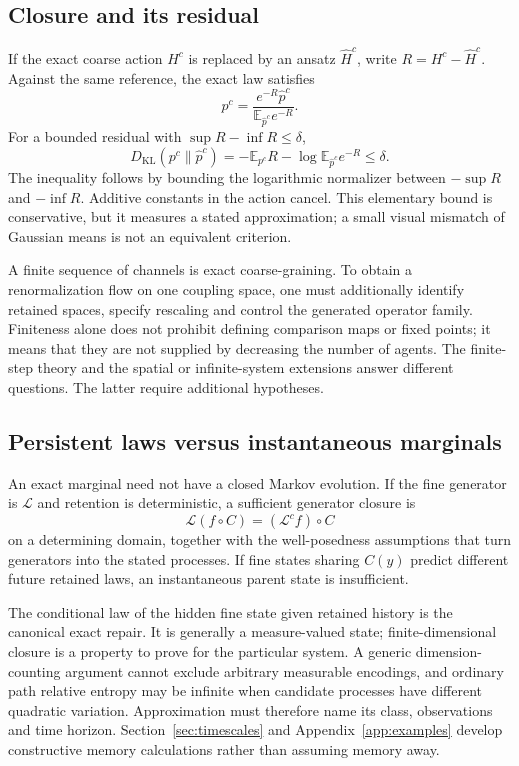 \subsection{Closure and its residual}
If the exact coarse action $H^c$ is replaced by an ansatz $\widehat H^c$, write $R=H^c-\widehat H^c$. Against the same reference, the exact law satisfies
\begin{equation}
p^c=\frac{e^{-R}\widehat p^c}{\mathbb E_{\widehat p^c}e^{-R}}.
\label{eq:coarse_residual_law}
\end{equation}
For a bounded residual with $\sup R-\inf R\leq\delta$,
\begin{equation}
D_{\mathrm{KL}}(p^c\|\widehat p^c)
=-\mathbb E_{p^c}R-\log\mathbb E_{\widehat p^c}e^{-R}
\leq\delta.
\label{eq:closure_residual_bound}
\end{equation}
The inequality follows by bounding the logarithmic normalizer between $-\sup R$ and $-\inf R$. Additive constants in the action cancel. This elementary bound is conservative, but it measures a stated approximation; a small visual mismatch of Gaussian means is not an equivalent criterion.

A finite sequence of channels is exact coarse-graining. To obtain a renormalization flow on one coupling space, one must additionally identify retained spaces, specify rescaling and control the generated operator family. Finiteness alone does not prohibit defining comparison maps or fixed points; it means that they are not supplied by decreasing the number of agents. The finite-step theory and the spatial or infinite-system extensions answer different questions. The latter require additional hypotheses.

\subsection{Persistent laws versus instantaneous marginals}
An exact marginal need not have a closed Markov evolution. If the fine generator is $\mathcal L$ and retention is deterministic, a sufficient generator closure is
\begin{equation}
\mathcal L(f\circ C)=(\mathcal L^cf)\circ C
\label{eq:generator_descent}
\end{equation}
on a determining domain, together with the well-posedness assumptions that turn generators into the stated processes. If fine states sharing $C(y)$ predict different future retained laws, an instantaneous parent state is insufficient.

The conditional law of the hidden fine state given retained history is the canonical exact repair. It is generally a measure-valued state; finite-dimensional closure is a property to prove for the particular system. A generic dimension-counting argument cannot exclude arbitrary measurable encodings, and ordinary path relative entropy may be infinite when candidate processes have different quadratic variation. Approximation must therefore name its class, observations and time horizon. Section~\ref{sec:timescales} and Appendix~\ref{app:examples} develop constructive memory calculations rather than assuming memory away.

